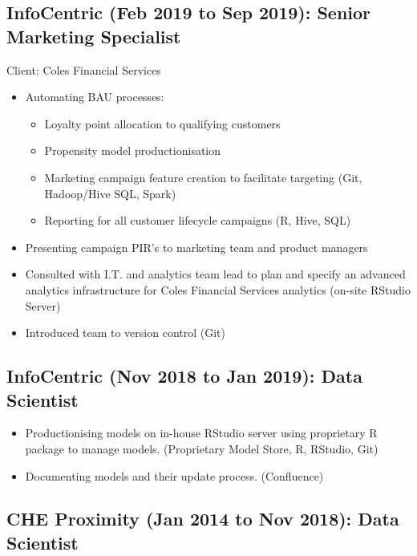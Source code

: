 \documentclass{article}
\begin{document}
\subsection{InfoCentric (Feb 2019 to Sep 2019): Senior Marketing Specialist}
Client: Coles Financial Services
\begin{itemize}
    \item Automating BAU processes:
        \begin{itemize}
            \item Loyalty point allocation to qualifying customers
            \item Propensity model productionisation 
            \item Marketing campaign feature creation to facilitate targeting (Git, Hadoop/Hive SQL, Spark)
            \item Reporting for all customer lifecycle campaigns (R, Hive, SQL)
        \end{itemize}
    \item Presenting campaign PIR’s to marketing team and product managers
    \item Consulted with I.T. and analytics team lead to plan and specify an advanced analytics infrastructure for Coles Financial Services analytics (on-site RStudio Server)
    \item Introduced team to version control (Git)
\end{itemize}

\subsection{InfoCentric (Nov 2018 to Jan 2019): Data Scientist}
\begin{itemize}
    \item Productionising models on in-house RStudio server using proprietary R package to manage models. (Proprietary Model Store, R, RStudio, Git)
    \item Documenting models and their update process. (Confluence)
\end{itemize}

\subsection{CHE Proximity (Jan 2014 to Nov 2018): Data Scientist}
\end{document}
